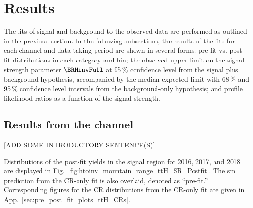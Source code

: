 \section{Results}
\label{sec:htoinv_results}

The fits of signal and background to the observed data are performed as outlined in the previous section. In the following subsections, the results of the fits for each channel and data taking period are shown in several forms: pre-fit vs. post-fit distributions in each category and \ptmiss bin; the observed upper limit on the signal strength parameter $\BRHinvFull$ at 95\,\% confidence level from the signal plus background hypothesis, accompanied by the median expected limit with 68\,\% and 95\,\% confidence level intervals from the background-only hypothesis; and profile likelihood ratios as a function of the signal strength.




\subsection{Results from the \texorpdfstring{\ttH}{ttH} channel}
\label{subsec:htoinv_analysis_ttH}

[ADD SOME INTRODUCTORY SENTENCE(S)]

Distributions of the post-fit yields in the signal region for 2016, 2017, and 2018 are displayed in Fig.~\ref{fig:htoinv_mountain_range_ttH_SR_Postfit}. The \acrshort{sm} prediction from the \gls{CR}-only fit is also overlaid, denoted as ``pre-fit.'' Corresponding figures for the \gls{CR} distributions from the \acrshort{CR}-only fit are given in App.~\ref{sec:pre_post_fit_plots_ttH_CRs}.

